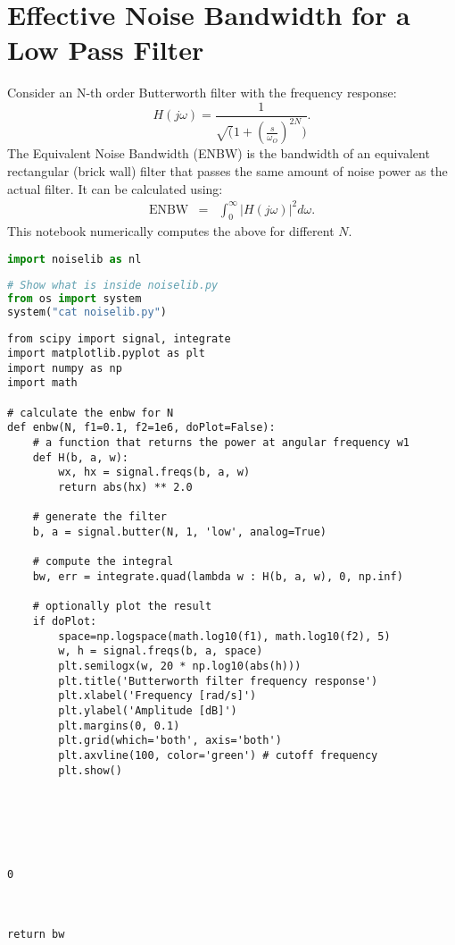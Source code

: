 \hypertarget{effective-noise-bandwidth-for-a-low-pass-filter}{%
\section{Effective Noise Bandwidth for a Low Pass
Filter}\label{effective-noise-bandwidth-for-a-low-pass-filter}}

Consider an N-th order Butterworth filter with the frequency response:
\[H(j\omega)=\frac{1}{\sqrt(1+(\frac{s}{\omega_O})^{2N})}.\] The
Equivalent Noise Bandwidth (ENBW) is the bandwidth of an equivalent
rectangular (brick wall) filter that passes the same amount of noise
power as the actual filter. It can be calculated using:
\[\begin{eqnarray}\text{ENBW}&=&\int_{0}^{\infty} |H(j\omega)|^2 d\omega.
\end{eqnarray}\] This notebook numerically computes the above for
different \(N\).

\begin{lstlisting}[language=Python]
import noiselib as nl
\end{lstlisting}

\begin{lstlisting}[language=Python]
# Show what is inside noiselib.py
from os import system
system("cat noiselib.py")
\end{lstlisting}

\begin{lstlisting}
from scipy import signal, integrate
import matplotlib.pyplot as plt
import numpy as np
import math

# calculate the enbw for N
def enbw(N, f1=0.1, f2=1e6, doPlot=False):
    # a function that returns the power at angular frequency w1
    def H(b, a, w):
        wx, hx = signal.freqs(b, a, w)
        return abs(hx) ** 2.0

    # generate the filter
    b, a = signal.butter(N, 1, 'low', analog=True) 
    
    # compute the integral
    bw, err = integrate.quad(lambda w : H(b, a, w), 0, np.inf)  
    
    # optionally plot the result
    if doPlot:
        space=np.logspace(math.log10(f1), math.log10(f2), 5)
        w, h = signal.freqs(b, a, space)
        plt.semilogx(w, 20 * np.log10(abs(h)))
        plt.title('Butterworth filter frequency response')
        plt.xlabel('Frequency [rad/s]')
        plt.ylabel('Amplitude [dB]')
        plt.margins(0, 0.1)
        plt.grid(which='both', axis='both')
        plt.axvline(100, color='green') # cutoff frequency
        plt.show()
        
    




0



return bw
\end{lstlisting}

